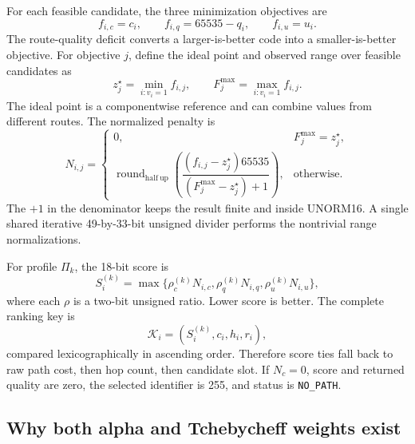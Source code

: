 For each feasible candidate, the three minimization objectives are
\begin{equation}
f_{i,c}=c_i,\qquad f_{i,q}=65535-q_i,\qquad f_{i,u}=u_i.
\label{eq:physical-objectives}
\end{equation}
The route-quality deficit converts a larger-is-better code into a
smaller-is-better objective. For objective $j$, define the ideal point and observed
range over feasible candidates as
\begin{equation}
z_j^\star=\min_{i:v_i=1}f_{i,j},\qquad
F_j^{\max}=\max_{i:v_i=1}f_{i,j}.
\label{eq:ideal-point}
\end{equation}
The ideal point is a componentwise reference and can combine values from different
routes. The normalized penalty is
\begin{equation}
N_{i,j}=\begin{cases}
0,&F_j^{\max}=z_j^\star,\\[2pt]
\operatorname{round}_{\mathrm{half\ up}}
\left(\dfrac{(f_{i,j}-z_j^\star)65535}
{(F_j^{\max}-z_j^\star)+1}\right),&\text{otherwise}.
\end{cases}
\label{eq:method-normalization}
\end{equation}
The $+1$ in the denominator keeps the result finite and inside UNORM16. A single
shared iterative 49-by-33-bit unsigned divider performs the nontrivial range
normalizations.

For profile $\Pi_k$, the 18-bit score is
\begin{equation}
S_i^{(k)}=\max\{\rho_c^{(k)}N_{i,c},
\rho_q^{(k)}N_{i,q},\rho_u^{(k)}N_{i,u}\},
\label{eq:method-score}
\end{equation}
where each $\rho$ is a two-bit unsigned ratio. Lower score is better. The complete
ranking key is
\begin{equation}
\mathcal K_i=(S_i^{(k)},c_i,h_i,r_i),
\label{eq:method-tie-key}
\end{equation}
compared lexicographically in ascending order. Therefore score ties fall back to
raw path cost, then hop count, then candidate slot. If $N_c=0$, score and returned
quality are zero, the selected identifier is 255, and status is
\texttt{NO\_PATH}.

\subsection{Why both alpha and Tchebycheff weights exist}

